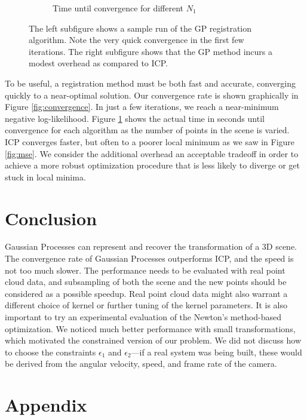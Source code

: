 \documentclass{article} %
\begin{document}
\begin{figure}
\begin{subfigure}[b]{0.5\textwidth}
                \caption{Time until convergence for different $N_1$}
                \label{fig:timing}
        \end{subfigure}
        \caption{The left subfigure shows a sample run of the GP registration algorithm. Note the very quick convergence in the first few iterations. The right subfigure shows that the GP method incurs a modest overhead as compared to ICP.}\label{fig:tests1}
\end{figure}

To be useful, a registration method must be both fast and accurate, converging quickly to a near-optimal solution. Our convergence rate is shown graphically in Figure \ref{fig:convergence}. In just a few iterations, we reach a near-minimum negative log-likelihood. Figure \ref{fig:timing} shows the actual time in seconds until convergence for each algorithm as the number of points in the scene is varied. ICP converges faster, but often to a poorer local minimum as we saw in Figure \ref{fig:mse}. We consider the additional overhead an acceptable tradeoff in order to achieve a more robust optimization procedure that is less likely to diverge or get stuck in local minima.

\section{Conclusion}
Gaussian Processes can represent and recover the transformation of a 3D scene. The convergence rate of Gaussian Processes outperforms ICP,
and the speed is not too much slower. The performance needs to be evaluated with real point cloud data, and subsampling of both the scene and the new points should be considered as a possible speedup. Real point cloud data might also warrant a different choice of kernel or further tuning of the kernel parameters. It is also important to try an experimental evaluation of the Newton's method-based optimization.
We noticed much better performance with small transformations, which motivated the constrained version of our problem. We did not discuss how to choose the constraints $\epsilon_1$ and $\epsilon_2$---if a real system was being built, these would be derived from the angular velocity, speed, and frame rate of the camera. 





\newpage

\section{Appendix}
\end{document}
